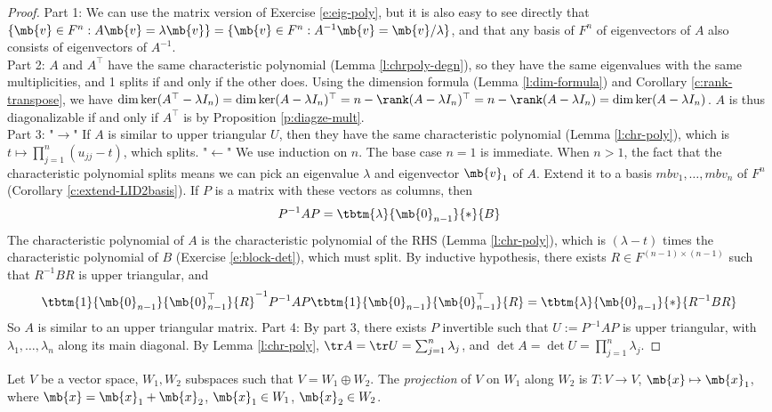\begin{proof}
Part 1: We can use the matrix version of Exercise \ref{e:eig-poly}, but it is also easy to see directly that $\{ \mb{v}\in F^n: A \mb{v}= \lambda \mb{v}\} = \{ \mb{v}\in F^n: A^{-1}\mb{v}= \mb{v}/ \lambda \}$, and that any basis of $F^n$ of eigenvectors of $A$ also consists of eigenvectors of $A^{-1}$.\\
Part 2: $A$ and $A^\top$ have the same characteristic polynomial (Lemma \ref{l:chrpoly-degn}), so they have the same eigenvalues with the same multiplicities, and 1 splits if and only if the other does.
Using the dimension formula (Lemma \ref{l:dim-formula}) and Corollary \ref{c:rank-transpose}, we have $\dim \ker(A^\top - \lambda I_n)= \dim \ker(A- \lambda I_n)^\top =n- \rank(A- \lambda I_n)^\top =n- \rank(A- \lambda I_n)= \dim \ker (A- \lambda I_n)$.
 $A$ is thus diagonalizable if and only if $A^\top$ is by Proposition \ref{p:diagze-mult}.\\
Part 3: "$\to$" If $A$ is similar to upper triangular $U$, then they have the same characteristic polynomial (Lemma \ref{l:chr-poly}), which is $t \mapsto \prod_{j=1}^n(u_{jj}-t)$, which splits.
"$\leftarrow$" We use induction on $n$. The base case $n=1$ is immediate. When $n>1$, the fact that the characteristic polynomial splits means we can pick an eigenvalue $\lambda$ and eigenvector $\mb{v}_1$ of $A$.
Extend it to a basis $mb{v}_1, \ldots, mb{v}_n$ of $F^n$ (Corollary \ref{c:extend-LID2basis}). If $P$ is a matrix with these vectors as columns, then
\[ P^{-1}AP= \tbtm{\lambda}{\mb{0}_{n-1}}{*}{B}\]
The characteristic polynomial of $A$ is the characteristic polynomial of the RHS (Lemma \ref{l:chr-poly}), which is $( \lambda -t)$ times the characteristic polynomial of $B$ (Exercise \ref{e:block-det}), which must split.
By inductive hypothesis, there exists $R \in F^{(n-1) \times(n-1)}$ such that $R^{-1}BR$ is upper triangular, and
\[ \tbtm{1}{\mb{0}_{n-1}}{\mb{0}_{n-1}^\top}{R}^{-1}P^{-1}AP \tbtm{1}{\mb{0}_{n-1}}{\mb{0}_{n-1}^\top}{R}= \tbtm{\lambda}{\mb{0}_{n-1}}{*}{R^{-1}BR}\]
So $A$ is similar to an upper triangular matrix.
Part 4: By part 3, there exists $P$ invertible such that $U:= P^{-1}AP$ is upper triangular, with $\lambda_1, \ldots, \lambda_n$ along its main diagonal. By Lemma \ref{l:chr-poly}, $\tr A= \tr U= \sum_{j=1}^n \lambda_j$, and $\det A= \det U= \prod_{j=1}^n \lambda_j$.
\end{proof}
\begin{defn}
Let $V$ be a vector space, $W_1,W_2$ subspaces such that $V=W_1 \oplus W_2$. The \emph{projection} of $V$ on $W_1$ along $W_2$ is $T:V \to V$, $\mb{x}\mapsto \mb{x}_1$, where $\mb{x}= \mb{x}_1+ \mb{x}_2$, $\mb{x}_1 \in W_1$, $\mb{x}_2 \in W_2$.
\end{defn}
